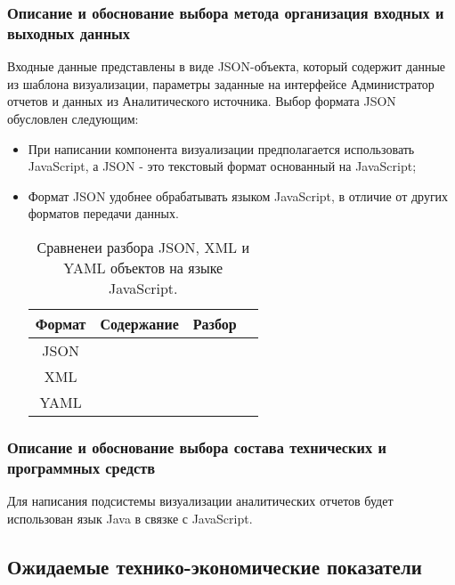 \documentclass[a4paper]{extarticle}
\begin{document}
\subsubsection{Описание и обоснование выбора метода организация входных и выходных данных}
Входные данные представлены в виде JSON-объекта, который содержит данные из шаблона визуализации, параметры заданные на интерфейсе Администратор отчетов и данных из Аналитического источника. Выбор формата JSON обусловлен следующим:
\begin{itemize}
\item При написании компонента визуализации предполагается использовать JavaScript, а JSON - это текстовый формат основанный на JavaScript;
\item Формат JSON удобнее обрабатывать языком JavaScript, в отличие от других форматов передачи данных.

\begin{table}[H]
\caption{Сравненеи разбора JSON, XML и YAML объектов на языке JavaScript.}
\centering
  \begin{tabular}{|c|c|c|c|}
  \hline
  Формат & Содержание & Разбор \\\hline
  JSON  &  
  & 
  \\\hline
  XML   &  
  & 
  \\\hline
  YAML  & 
  & 
  \\\hline
  \end{tabular}
\end{table}\par
\end{itemize}

\subsubsection{Описание и обоснование выбора состава технических и программных средств}
Для написания подсистемы визуализации аналитических отчетов будет использован язык Java в связке с JavaScript.\par


\subsection{Ожидаемые технико-экономические показатели}
\end{document}
